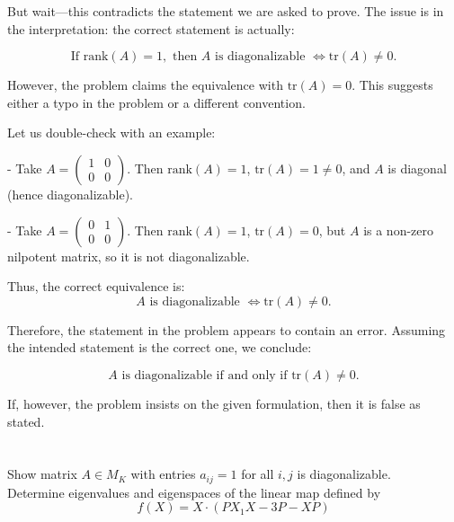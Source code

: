 \documentclass[12pt]{article}
\begin{document}
\begin{correctionbox}
But wait—this contradicts the statement we are asked to prove. The issue is in the interpretation: the correct statement is actually:

\[
\text{If } \mathrm{rank}(A) = 1, \text{ then } A \text{ is diagonalizable } \iff \mathrm{tr}(A) \neq 0.
\]

However, the problem claims the equivalence with $ \mathrm{tr}(A) = 0 $. This suggests either a typo in the problem or a different convention.

Let us double-check with an example:

- Take $ A = \begin{pmatrix} 1 & 0 \\ 0 & 0 \end{pmatrix} $. Then $ \mathrm{rank}(A) = 1 $, $ \mathrm{tr}(A) = 1 \neq 0 $, and $ A $ is diagonal (hence diagonalizable).

- Take $ A = \begin{pmatrix} 0 & 1 \\ 0 & 0 \end{pmatrix} $. Then $ \mathrm{rank}(A) = 1 $, $ \mathrm{tr}(A) = 0 $, but $ A $ is a non-zero nilpotent matrix, so it is not diagonalizable.

Thus, the correct equivalence is:  
\[
A \text{ is diagonalizable } \iff \mathrm{tr}(A) \neq 0.
\]

Therefore, the statement in the problem appears to contain an error. Assuming the intended statement is the correct one, we conclude:

\[
\boxed{A \text{ is diagonalizable if and only if } \mathrm{tr}(A) \neq 0.}
\]

If, however, the problem insists on the given formulation, then it is false as stated.
\end{correctionbox}

\section{}
Show matrix \( A \in M_K \) with entries \( a_{ij} = 1 \) for all \( i,j \) is diagonalizable.\\
Determine eigenvalues and eigenspaces of the linear map defined by
\[
f(X) = X \cdot (P X_1 X - 3P - XP)
\]
\end{document}
